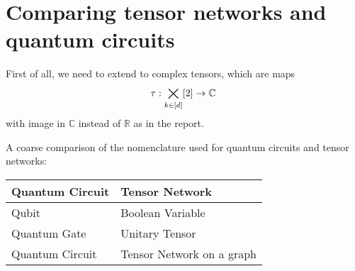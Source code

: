 \documentclass[aps,onecolumn,nofootinbib,pra]{article}
\begin{document}
    \appendix


    \section{Comparing tensor networks and quantum circuits}

    First of all, we need to extend to complex tensors, which are maps
    \begin{align*}
        \tau : \bigtimes_{k\in[d]}[2] \rightarrow \mathbb{C} \,
    \end{align*}
    with image in $\mathbb{C}$ instead of $\mathbb{R}$ as in the report.

    A coarse comparison of the nomenclature used for quantum circuits and tensor networks:

    \begin{center}
        \begin{tabular}{l|l}
            \textbf{Quantum Circuit} & \textbf{Tensor Network}   \\
            \hline
            Qubit                    & Boolean Variable          \\
            Quantum Gate             & Unitary Tensor            \\
            Quantum Circuit          & Tensor Network on a graph
        \end{tabular}
    \end{center}
\end{document}
